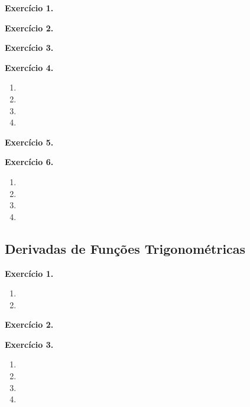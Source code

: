 \documentclass[12pt,a4paper]{article}
\begin{document}
\vspace{0.5cm}
\noindent\textbf{Exercício 1.}

\vspace{0.5cm}
\noindent\textbf{Exercício 2.}

\vspace{0.5cm}
\noindent\textbf{Exercício 3.}

\vspace{0.5cm}
\noindent\textbf{Exercício 4.}
\begin{enumerate}
    \renewcommand{\theenumi}{\alph{enumi}}
    \renewcommand{\labelenumi}{\theenumi)}
    \item 
    \item 
    \item 
    \item 
\end{enumerate}

\vspace{0.5cm}
\noindent\textbf{Exercício 5.}

\vspace{0.5cm}
\noindent\textbf{Exercício 6.}
\begin{enumerate}
    \renewcommand{\theenumi}{\alph{enumi}}
    \renewcommand{\labelenumi}{\theenumi)}
    \item 
    \item 
    \item 
    \item 
\end{enumerate}

\subsection{Derivadas de Funções Trigonométricas}

\vspace{0.5cm}
\noindent\textbf{Exercício 1.}
\begin{enumerate}
    \renewcommand{\theenumi}{\alph{enumi}}
    \renewcommand{\labelenumi}{\theenumi)}
    \item 
    \item 
\end{enumerate}

\vspace{0.5cm}
\noindent\textbf{Exercício 2.}

\vspace{0.5cm}
\noindent\textbf{Exercício 3.}
\begin{enumerate}
    \renewcommand{\theenumi}{\alph{enumi}}
    \renewcommand{\labelenumi}{\theenumi)}
    \item 
    \item 
    \item 
    \item 
\end{enumerate}
\end{document}
